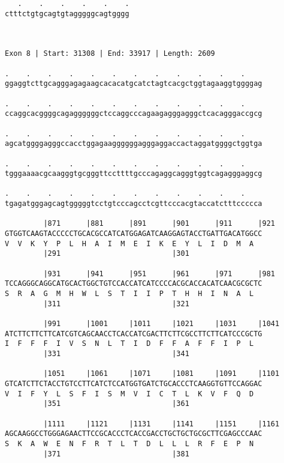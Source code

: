 \documentclass{article}
\begin{document}
\begin{Verbatim}
   .    .    .    .    .    .
ctttctgtgcagtgtagggggcagtgggg
                             
                             
 
Exon 8 | Start: 31308 | End: 33917 | Length: 2609
 
.    .    .    .    .    .    .    .    .    .    .    .    
ggaggtcttgcagggagagaagcacacatgcatctagtcacgctggtagaaggtggggag
                                                            
.    .    .    .    .    .    .    .    .    .    .    .    
ccaggcacggggcagaggggggctccaggcccagaagagggagggctcacagggaccgcg
                                                            
.    .    .    .    .    .    .    .    .    .    .    .    
agcatggggagggccacctggagaaggggggagggaggaccactaggatggggctggtga
                                                            
.    .    .    .    .    .    .    .    .    .    .    .    
tgggaaaacgcaagggtgcgggttccttttgcccagaggcagggtggtcagagggaggcg
                                                            
.    .    .    .    .    .    .    .    .    .    .    .    
tgagatgggagcagtgggggtcctgtcccagcctcgttcccacgtaccatctttccccca
                                                            
         |871      |881      |891      |901      |911      |921
GTGGTCAAGTACCCCCTGCACGCCATCATGGAGATCAAGGAGTACCTGATTGACATGGCC
V  V  K  Y  P  L  H  A  I  M  E  I  K  E  Y  L  I  D  M  A  
         |291                          |301                 
  
         |931      |941      |951      |961      |971      |981
TCCAGGGCAGGCATGCACTGGCTGTCCACCATCATCCCCACGCACCACATCAACGCGCTC
S  R  A  G  M  H  W  L  S  T  I  I  P  T  H  H  I  N  A  L  
         |311                          |321                 
  
         |991      |1001     |1011     |1021     |1031     |1041
ATCTTCTTCTTCATCGTCAGCAACCTCACCATCGACTTCTTCGCCTTCTTCATCCCGCTG
I  F  F  F  I  V  S  N  L  T  I  D  F  F  A  F  F  I  P  L  
         |331                          |341                 
  
         |1051     |1061     |1071     |1081     |1091     |1101
GTCATCTTCTACCTGTCCTTCATCTCCATGGTGATCTGCACCCTCAAGGTGTTCCAGGAC
V  I  F  Y  L  S  F  I  S  M  V  I  C  T  L  K  V  F  Q  D  
         |351                          |361                 
  
         |1111     |1121     |1131     |1141     |1151     |1161
AGCAAGGCCTGGGAGAACTTCCGCACCCTCACCGACCTGCTGCTGCGCTTCGAGCCCAAC
S  K  A  W  E  N  F  R  T  L  T  D  L  L  L  R  F  E  P  N  
         |371                          |381                 
  

\end{Verbatim}
\end{document}
